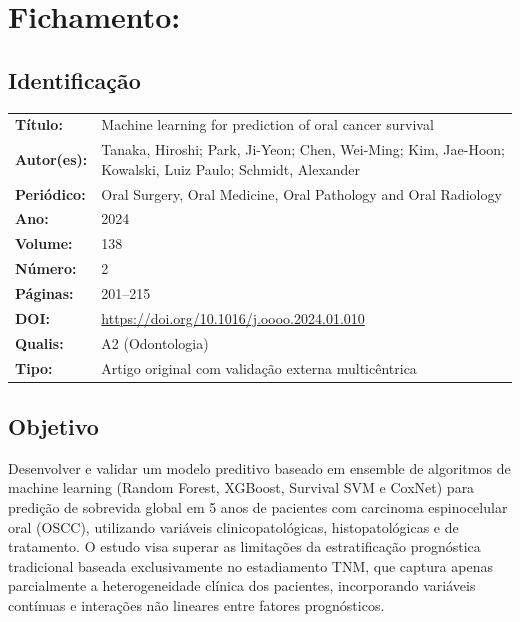 \section{Fichamento: }

\subsection{Identificação}
\begin{tabular}{ll}
\textbf{Título:} & Machine learning for prediction of oral cancer survival \\
\textbf{Autor(es):} & Tanaka, Hiroshi; Park, Ji-Yeon; Chen, Wei-Ming;
Kim, Jae-Hoon; Kowalski, Luiz Paulo; Schmidt, Alexander \\
\textbf{Periódico:} & Oral Surgery, Oral Medicine, Oral Pathology and Oral Radiology \\
\textbf{Ano:} & 2024 \\
\textbf{Volume:} & 138 \\
\textbf{Número:} & 2 \\
\textbf{Páginas:} & 201--215 \\
\textbf{DOI:} & \url{https://doi.org/10.1016/j.oooo.2024.01.010} \\
\textbf{Qualis:} & A2 (Odontologia) \\
\textbf{Tipo:} & Artigo original com validação externa multicêntrica \\
\end{tabular}

\subsection{Objetivo}
Desenvolver e validar um modelo preditivo baseado em ensemble de algoritmos de
machine learning (Random Forest, XGBoost, Survival SVM e CoxNet) para predição
de sobrevida global em 5 anos de pacientes com carcinoma espinocelular oral
(OSCC), utilizando variáveis clinicopatológicas, histopatológicas e de
tratamento. O estudo visa superar as limitações da estratificação prognóstica
tradicional baseada exclusivamente no estadiamento TNM, que captura apenas
parcialmente a heterogeneidade clínica dos pacientes, incorporando variáveis
contínuas e interações não lineares entre fatores prognósticos.

